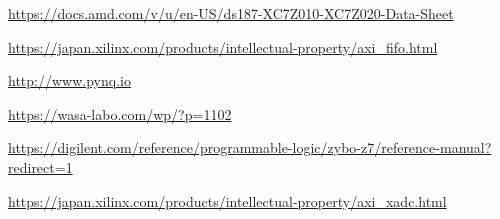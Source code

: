 \begin{thebibliography}{99}
\href{https://docs.amd.com/v/u/en-US/ds187-XC7Z010-XC7Z020-Data-Sheet}{https://docs.amd.com/v/u/en-US/ds187-XC7Z010-XC7Z020-Data-Sheet}

\href{https://japan.xilinx.com/products/intellectual-property/axi\_fifo.html}{https://japan.xilinx.com/products/intellectual-property/axi\_fifo.html}

\href{http://www.pynq.io}{http://www.pynq.io}

\href{https://wasa-labo.com/wp/?p=1102}{https://wasa-labo.com/wp/?p=1102}

\href{https://digilent.com/reference/programmable-logic/zybo-z7/reference-manual?redirect=1}{https://digilent.com/reference/programmable-logic/zybo-z7/reference-manual?redirect=1}

\href{https://japan.xilinx.com/products/intellectual-property/axi\_xadc.html}{https://japan.xilinx.com/products/intellectual-property/axi\_xadc.html}



\end{thebibliography}
